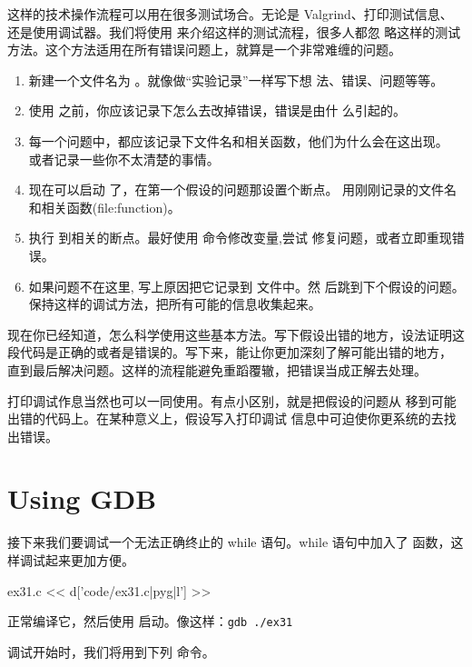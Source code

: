 \begin{enumerate}
这样的技术操作流程可以用在很多测试场合。无论是 Valgrind、打印测试信息、
还是使用调试器。我们将使用  来介绍这样的测试流程，很多人都忽
略这样的测试方法。这个方法适用在所有错误问题上，就算是一个非常难缠的问题。

\begin{enumerate}
\item 新建一个文件名为 。就像做“实验记录”一样写下想
  法、错误、问题等等。
\item 使用  之前，你应该记录下怎么去改掉错误，错误是由什
  么引起的。
\item 每一个问题中，都应该记录下文件名和相关函数，他们为什么会在这出现。
  或者记录一些你不太清楚的事情。
\item 现在可以启动  了，在第一个假设的问题那设置个断点。
  用刚刚记录的文件名和相关函数(file:function)。
\item 执行  到相关的断点。最好使用  命令修改变量,尝试
  修复问题，或者立即重现错误。
\item 如果问题不在这里, 写上原因把它记录到  文件中。然
  后跳到下个假设的问题。保持这样的调试方法，把所有可能的信息收集起来。
\end{enumerate}


现在你已经知道，怎么科学使用这些基本方法。写下假设出错的地方，设法证明这
段代码是正确的或者是错误的。写下来，能让你更加深刻了解可能出错的地方，
直到最后解决问题。这样的流程能避免重蹈覆辙，把错误当成正解去处理。

打印调试作息当然也可以一同使用。有点小区别，就是把假设的问题从
 移到可能出错的代码上。在某种意义上，假设写入打印调试
信息中可迫使你更系统的去找出错误。


\section{Using GDB}

接下来我们要调试一个无法正确终止的 while 语句。while 语句中加入了
 函数，这样调试起来更加方便。

\begin{code}{ex31.c}
<< d['code/ex31.c|pyg|l'] >>
\end{code}

正常编译它，然后使用  启动。像这样：\verb|gdb ./ex31|

调试开始时，我们将用到下列  命令。


\end{enumerate}
